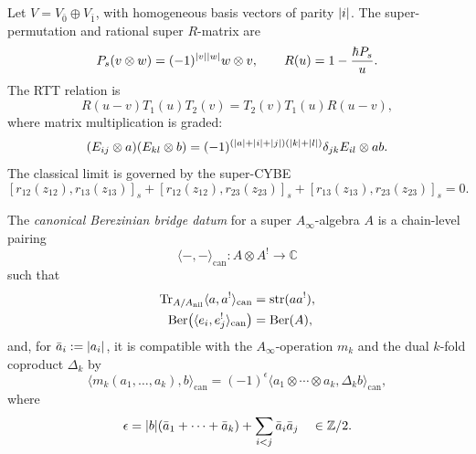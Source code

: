 \begin{definition}
\label{def:canonical-berezinian-bridge-datum}
Let \(V=V_{\bar0}\oplus V_{\bar1}\), with homogeneous basis vectors of
parity \(|i|\). The super-permutation and rational super
\(R\)-matrix are
\begin{equation}
\label{eq:canonical-bridge-super-r}
P_s(v\otimes w)=(-1)^{|v||w|}w\otimes v,
\qquad
R(u)=1-\frac{\hbar P_s}{u}.
\end{equation}
The RTT relation is
\begin{equation}
\label{eq:canonical-bridge-super-rtt}
R(u-v)T_1(u)T_2(v)=T_2(v)T_1(u)R(u-v),
\end{equation}
where matrix multiplication is graded:
\begin{equation}
\label{eq:canonical-bridge-graded-matrix-product}
(E_{ij}\otimes a)(E_{kl}\otimes b)
=
(-1)^{(|a|+|i|+|j|)(|k|+|l|)}
\delta_{jk}E_{il}\otimes ab .
\end{equation}
The classical limit is governed by the super-CYBE
\begin{equation}
\label{eq:canonical-bridge-super-cybe}
[r_{12}(z_{12}),r_{13}(z_{13})]_s
+[r_{12}(z_{12}),r_{23}(z_{23})]_s
+[r_{13}(z_{13}),r_{23}(z_{23})]_s=0.
\end{equation}

The \emph{canonical Berezinian bridge datum} for a super
\(A_\infty\)-algebra \(A\) is a chain-level pairing
\begin{equation}
\label{eq:canonical-berezinian-pairing}
\langle-,-\rangle_{\mathrm{can}}\colon A\otimes A^!\longrightarrow \mathbb C
\end{equation}
such that
\begin{align}
\label{eq:canonical-bridge-supertrace-shadow}
\operatorname{Tr}_{A/A_{\mathrm{nil}}}
\langle a,a^!\rangle_{\mathrm{can}}
&=\operatorname{str}(aa^!),\\
\label{eq:canonical-bridge-berezinian-determinant}
\operatorname{Ber}\bigl(\langle e_i,e^!_j\rangle_{\mathrm{can}}\bigr)
&=\operatorname{Ber}(A),
\end{align}
and, for \(\bar a_i:=|a_i|\), it is compatible with the
\(A_\infty\)-operation \(m_k\) and the dual \(k\)-fold coproduct
\(\Delta_k\) by
\begin{equation}
\label{eq:canonical-bridge-mk-deltak-compatibility}
\langle m_k(a_1,\dots,a_k),b\rangle_{\mathrm{can}}
=
(-1)^{\epsilon}
\langle a_1\otimes\cdots\otimes a_k,\Delta_k b\rangle_{\mathrm{can}},
\end{equation}
where
\begin{equation}
\label{eq:canonical-bridge-epsilon-sign}
\epsilon
=
|b|(\bar a_1+\cdots+\bar a_k)
+
\sum_{i<j}\bar a_i\bar a_j
\quad \in \mathbb Z/2.
\end{equation}
\end{definition}

